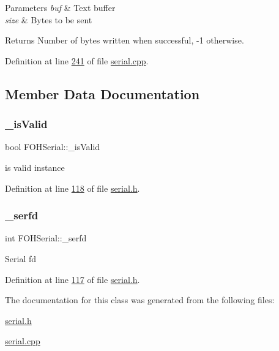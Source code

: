 \begin{DoxyParams}{Parameters}
{\em buf} & Text buffer \\
\hline
{\em size} & Bytes to be sent\\
\hline
\end{DoxyParams}
\begin{DoxyReturn}{Returns}
Number of bytes written when successful, -\/1 otherwise. 
\end{DoxyReturn}


Definition at line \mbox{\hyperlink{serial_8cpp_source_l00241}{241}} of file \mbox{\hyperlink{serial_8cpp_source}{serial.\+cpp}}.



\subsection{Member Data Documentation}
\mbox{\label{classFOHSerial_a26a5f17316ae345ebbdb8d99d3ad2a84}} 
\subsubsection{\texorpdfstring{\+\_\+is\+Valid}{\_isValid}}
{\footnotesize\ttfamily bool F\+O\+H\+Serial\+::\+\_\+is\+Valid\hspace{0.3cm}{\ttfamily [private]}}

is valid instance 

Definition at line \mbox{\hyperlink{serial_8h_source_l00118}{118}} of file \mbox{\hyperlink{serial_8h_source}{serial.\+h}}.

\mbox{\label{classFOHSerial_ab682f6f446d38c7954dfb9cae43b6c73}} 
\subsubsection{\texorpdfstring{\+\_\+serfd}{\_serfd}}
{\footnotesize\ttfamily int F\+O\+H\+Serial\+::\+\_\+serfd\hspace{0.3cm}{\ttfamily [private]}}

Serial fd 

Definition at line \mbox{\hyperlink{serial_8h_source_l00117}{117}} of file \mbox{\hyperlink{serial_8h_source}{serial.\+h}}.



The documentation for this class was generated from the following files\+:\begin{DoxyCompactItemize}
\item 
\mbox{\hyperlink{serial_8h}{serial.\+h}}\item 
\mbox{\hyperlink{serial_8cpp}{serial.\+cpp}}\end{DoxyCompactItemize}
